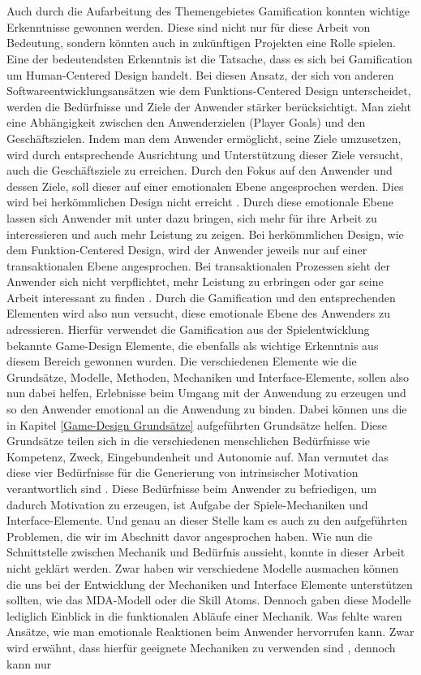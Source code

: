 \documentclass[a4paper,12pt,twoside]{scrartcl}
\begin{document}
\\\\
Auch durch die Aufarbeitung des Themengebietes Gamification konnten wichtige Erkenntnisse gewonnen werden. Diese sind nicht nur für diese Arbeit von Bedeutung, sondern könnten auch in zukünftigen Projekten eine Rolle spielen. Eine der bedeutendsten Erkenntnis ist die Tatsache, dass es sich bei Gamification um Human-Centered Design handelt. Bei diesen Ansatz, der sich von anderen Softwareentwicklungsansätzen wie dem Funktions-Centered Design unterscheidet, werden die Bedürfnisse und Ziele der Anwender stärker berücksichtigt. Man zieht eine Abhängigkeit zwischen den Anwenderzielen (Player Goals) und den Geschäftszielen. Indem man dem Anwender ermöglicht, seine Ziele umzusetzen, wird durch entsprechende Ausrichtung und Unterstützung dieser Ziele versucht, auch die Geschäftsziele zu erreichen. Durch den Fokus auf den Anwender und dessen Ziele, soll dieser auf einer emotionalen Ebene angesprochen werden. Dies wird bei herkömmlichen Design nicht erreicht \cite{gamificationDefinition}. Durch diese emotionale Ebene lassen sich Anwender mit unter dazu bringen, sich mehr für ihre Arbeit zu interessieren und auch mehr Leistung zu zeigen. Bei herkömmlichen Design, wie dem Funktion-Centered Design, wird der Anwender jeweils nur auf einer transaktionalen Ebene angesprochen. Bei transaktionalen Prozessen sieht der Anwender sich nicht verpflichtet, mehr Leistung zu erbringen oder gar seine Arbeit interessant zu finden \cite{gamificationDefinition}. Durch die Gamification und den entsprechenden Elementen wird also nun versucht, diese emotionale Ebene des Anwenders zu adressieren. Hierfür verwendet die Gamification aus der Spielentwicklung bekannte Game-Design Elemente, die ebenfalls als wichtige Erkenntnis aus diesem Bereich gewonnen wurden. Die verschiedenen Elemente wie die Grundsätze, Modelle, Methoden, Mechaniken und Interface-Elemente, sollen also nun dabei helfen, Erlebnisse beim Umgang mit der Anwendung zu erzeugen und so den Anwender emotional an die Anwendung zu binden. Dabei können uns die in Kapitel \ref{Game-Design Grundsätze} aufgeführten Grundsätze helfen. Diese Grundsätze teilen sich in die verschiedenen menschlichen Bedürfnisse wie Kompetenz, Zweck, Eingebundenheit und Autonomie auf. Man vermutet das diese vier Bedürfnisse für die Generierung von intrinsischer Motivation verantwortlich sind \cite{Rigby2011}. Diese Bedürfnisse beim Anwender zu befriedigen, um dadurch Motivation zu erzeugen, ist Aufgabe der Spiele-Mechaniken und Interface-Elemente. Und genau an dieser Stelle kam es auch zu den aufgeführten Problemen, die wir im Abschnitt davor angesprochen haben. Wie nun die Schnittstelle zwischen Mechanik und Bedürfnis aussieht, konnte in dieser Arbeit nicht geklärt werden. Zwar haben wir verschiedene Modelle ausmachen können die uns bei der Entwicklung der Mechaniken und Interface Elemente unterstützen sollten, wie das MDA-Modell oder die Skill Atoms. Dennoch gaben diese Modelle lediglich Einblick in die funktionalen Abläufe einer Mechanik. Was fehlte waren Ansätze, wie man emotionale Reaktionen beim Anwender hervorrufen kann. Zwar wird erwähnt, dass hierfür geeignete Mechaniken zu verwenden sind \cite{gamificationDefinition}, dennoch kann nur 
\end{document}
